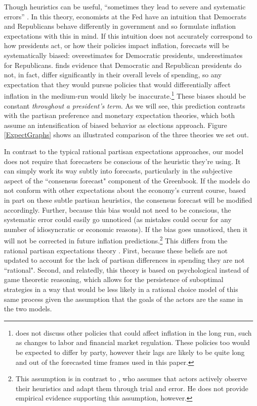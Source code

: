 \documentclass[a4paper]{article}
\begin{document}
Though heuristics can be useful, ``sometimes they lead to severe and systematic errors'' \citep[][1124]{tverskykahneman1974}. In this theory, economists at the Fed have an intuition that Democrats and Republicans behave differently in government and so formulate inflation expectations with this in mind. If this intuition does not accurately correspond to how presidents act, or how their policies impact inflation, forecasts will be systematically biased: overestimates for Democratic presidents, underestimates for Republicans. \cite{Bartels2008} finds evidence that Democratic and Republican presidents do not, in fact, differ significantly in their overall levels of spending, so any expectation that they would pursue policies that would differentially affect inflation in the medium-run would likely be inaccurate.\footnote{\cite{Bartels2008} does not discuss other policies that could affect inflation in the long run, such as changes to labor and financial market regulation. These policies too would be expected to differ by party, however their lags are likely to be quite long and out of the forecasted time frames used in this paper.} These biases should be constant {\emph{throughout a president's term}}. As we will see, this prediction contrasts with the partisan preference and monetary expectation theories, which both assume an intensification of biased behavior as elections approach. Figure \ref{ExpectGraphs} shows an illustrated comparison of the three theories we set out.

In contrast to the typical rational partisan expectations approaches, our model does not require that forecasters be conscious of the heuristic they're using. It can simply work its way subtly into forecasts, particularly in the subjective aspect of the ``consensus forecast" component of the Greenbook. If the models do not conform with other expectations about the economy's current course, based in part on these subtle partisan heuristics, the consensus forecast will be modified accordingly. Further, because this bias would not need to be conscious, the systematic error could easily go unnoticed (as mistakes could occur for any number of idiosyncratic or economic reasons). If the bias goes unnoticed, then it will not be corrected in future inflation predictions.\footnote{This assumption is in contrast to \cite{Grauwe2011}, who assumes that actors actively observe their heuristics and adapt them through trial and error. He does not provide empirical evidence supporting this assumption, however.} This differs from the rational partisan expectations theory \cite[e.g.][]{Alesina1987,Alesina1991,Alesina1997,Hibbs1994}. First, because these beliefs are not updated to account for the lack of partisan differences in spending they are not ``rational". Second, and relatedly, this theory is based on psychological instead of game theoretic reasoning, which allows for the persistence of suboptimal strategies in a way that would be less likely in a rational choice model of this same process given the assumption that the goals of the actors are the same in the two models.
\end{document}
